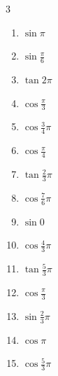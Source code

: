 \begin{multicols}{3}
\begin{enumerate}
  \item $\displaystyle \sin{\pi}$
        \phantom{$\displaystyle =0$}

  \item $\displaystyle \sin{\frac{\pi}{6}}$

  \item $\displaystyle \tan{2\pi}$
        \phantom{$\displaystyle =0$}

  \item $\displaystyle \cos{\frac{\pi}{3}}$

  \item $\displaystyle \cos{\frac{3}{4}\pi}$

  \item $\displaystyle \cos{\frac{\pi}{4}}$

  \item $\displaystyle \tan{\frac{2}{3}\pi}$

  \item $\displaystyle \cos{\frac{7}{6}\pi}$

  \item $\displaystyle \sin{0}$
        \phantom{$\displaystyle =0$}

  \item $\displaystyle \cos{\frac{4}{3}\pi}$

  \item $\displaystyle \tan{\frac{5}{3}\pi}$

  \item $\displaystyle \cos{\frac{\pi}{3}}$

  \item $\displaystyle \sin{\frac{2}{3}\pi}$

\columnbreak %

\resetques

  \item $\displaystyle \cos{\pi}$
        \phantom{$\displaystyle =-1$}

  \item $\displaystyle \cos{\frac{5}{3}\pi}$


\end{enumerate}
\end{multicols}

